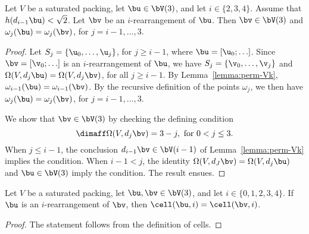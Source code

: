 \begin{lemma}[]\label{lemma:i-omega} %
  Let $V$ be a saturated packing, let $\bu\in \bV(3)$, and let
  $i\in\{2,3,4\}$.  Assume that $h(d_{i-1}\bu)<\sqrt2$.  Let $\bv$ be
  an $i$-rearrangement of $\bu$.  Then $\bv\in \bV(3)$ and
$\omega_j(\bu)=\omega_j(\bv)$,
  for $j=i-1,\ldots,3$.
\end{lemma}

\begin{proof}
Let $S_j =\{\u_0,\ldots,\u_{j}\}$, for $j\ge i-1$, where
  $\bu=[\u_0;\ldots]$.  Since $\bv=[\v_0;\ldots]$ is an
  $i$-rearrangement of $\bu$, we have $S_j =\{\v_0,\ldots,\v_{j}\}$ and
  $\Omega(V,d_j\bu) = \Omega(V,d_j\bv)$,
for all $j\ge i-1$. 
   By Lemma~\ref{lemma:perm-Vk},
  $\omega_{i-1}(\bu) = \omega_{i-1}(\bv)$.  By the recursive
  definition of the points $\omega_j$, we then have
  $\omega_j(\bu)=\omega_j(\bv)$, for $j= i-1,\ldots,3$.

  We show that $\bv\in \bV(3)$ by checking the defining condition
\[
\dimaff \Omega(V,d_j\bv) = 3 - j, \text{ for } 0 < j \le 3.
\]
When $j\le i-1$, the conclusion $d_{i-1}\bv\in \bV(i-1)$ of
Lemma~\ref{lemma:perm-Vk} implies the condition.  When $i-1<j$, the
identity $\Omega(V,d_J\bv)=\Omega(V,d_j\bu)$ and $\bu\in \bV(3)$ imply
the condition.  The result ensues.
\end{proof}

\begin{lemma}[]\label{lemma:marchal-equal} 
Let $V$ be a saturated packing, 
let $\bu,\bv\in \bV(3)$, and let $i\in \{0,1,2,3,4\}$.
If $\bu$ is an $i$-rearrangement of $\bv$, 
then $\cell(\bu,i)=\cell(\bv,i)$.
\end{lemma}

\begin{proof} 
The  statement follows from the definition of cells.
%
\end{proof}

